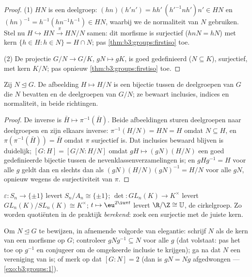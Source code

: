 \begin{proof}
(1) $HN$ is een deelgroep: $(hn)(h'n') = hh'\,(h'^{-1}nh')n' \in
HN$ en $(hn)^{-1} = h^{-1}(hn^{-1}h^{-1}) \in HN$, waarbij we de
normaliteit van $N$ gebruiken. Stel nu $H \hookrightarrow HN
\xrightarrow{\pi} HN/N$ samen: dit morfisme is surjectief ($hnN =
hN$) met kern $\{h \in H : h \in N\} = H \cap N$; pas
\cref{thm:b3:groups:firstiso} toe.

(2) De projectie $G/N \to G/K$, $gN \mapsto gK$, is goed
gedefinieerd ($N \subseteq K$), surjectief, met kern $K/N$; pas
opnieuw \cref{thm:b3:groups:firstiso} toe.
\end{proof}

\begin{theorem}[Correspondentiestelling]\label{thm:b3:groups:correspondence}
Zij $N \trianglelefteq G$. De afbeelding $H \mapsto H/N$ is een
bijectie tussen de deelgroepen van $G$ die $N$ bevatten en de
deelgroepen van $G/N$; ze bewaart inclusies, indices en
normaliteit, in beide richtingen.
\end{theorem}

\begin{proof}
De inverse is $\bar H \mapsto \pi^{-1}(\bar H)$. Beide
afbeeldingen sturen deelgroepen naar deelgroepen en zijn elkaars
inverse: $\pi^{-1}(H/N) = HN = H$ omdat $N \subseteq H$, en
$\pi(\pi^{-1}(\bar H)) = \bar H$ omdat $\pi$ surjectief is. Dat
inclusies bewaard blijven is duidelijk; $[G:H] = [G/N : H/N]$ omdat
$gH \mapsto (gN)(H/N)$ een goed gedefinieerde bijectie tussen de
nevenklassenverzamelingen is; en $gHg^{-1} = H$ voor alle $g$ geldt
dan en slechts dan als $(gN)(H/N)(gN)^{-1} = H/N$ voor alle $gN$,
opnieuw wegens de surjectiviteit van $\pi$.
\end{proof}

\begin{example}\label{ex:b3:groups:firstiso}
$\varepsilon \colon S_n \to \{\pm 1\}$ levert $S_n/A_n \cong
\{\pm1\}$; $\det \colon GL_n(K) \to K^\times$ levert
$GL_n(K)/SL_n(K) \cong K^\times$; $t \mapsto \eu^{2\iu\pi t}$
levert $\R/\Z \cong \mathbb U$, de cirkelgroep. Zo worden
quotiënten in de praktijk \emph{berekend}: zoek een surjectie met
de juiste kern.
\end{example}

\begin{method}\label{met:b3:groups:normal}
Om $N \trianglelefteq G$ te bewijzen, in afnemende volgorde van
elegantie: schrijf $N$ als de kern van een morfisme op $G$;
controleer $gNg^{-1} \subseteq N$ voor alle $g$ (dat volstaat: pas
het toe op $g^{-1}$ en conjugeer om de omgekeerde inclusie te
krijgen); ga na dat $N$ een vereniging van  is; of
merk op dat $[G:N] = 2$ (dan is $gN = Ng$ afgedwongen ---
\cref{exo:b3:groups:1}).
\end{method}

